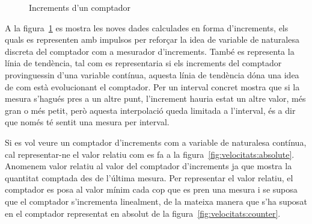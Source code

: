 \begin{figure}[tbp]
  \centering
  \caption{Increments d'un comptador}
  \label{fig:velocitats:deltes}
\end{figure}


A la figura~\ref{fig:velocitats:deltes} es mostra les noves dades calculades en forma d'increments, els quals es representen amb impulsos per reforçar la idea de variable de naturalesa discreta del comptador com a mesurador d'increments. 
També es representa la línia de tendència, tal com es representaria si els increments del comptador provinguessin d'una variable contínua, aquesta línia de tendència dóna una idea de com està evolucionant el comptador. Per un interval concret mostra que si la mesura s'hagués pres a un altre punt, l'increment hauria estat un altre valor, més gran o més petit, però aquesta interpolació queda limitada a l'interval, és a dir que només té sentit una mesura per interval.


Si es vol veure un comptador d'increments com a variable de naturalesa contínua, cal representar-ne el valor relatiu com es fa a la figura~\ref{fig:velocitats:absolute}.
Anomenem valor relatiu al valor del comptador d'increments ja que mostra la quantitat comptada des de l'última mesura. Per representar el valor relatiu, el comptador es posa al valor mínim cada cop que es pren una mesura i se suposa que el comptador s'incrementa linealment, de la mateixa manera que s'ha suposat en el comptador representat en absolut de la figura~\ref{fig:velocitats:counter}.


